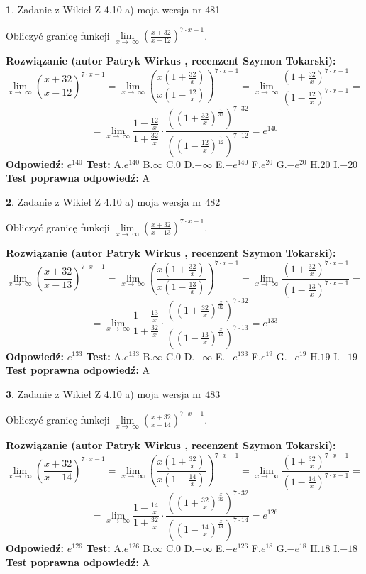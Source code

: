 \documentclass[12pt, a4paper]{article}
\theoremstyle{definition} %
\newtheorem{zad}{}
\newcommand{\zadStart}[1]{\begin{zad}#1\newline}
\newcommand{\zadStop}{\end{zad}}
\newcommand{\rozwStart}[2]{\noindent \textbf{Rozwiązanie (autor #1 , recenzent #2): }\newline}
\newcommand{\rozwStop}{\newline}
\newcommand{\odpStart}{\noindent \textbf{Odpowiedź:}\newline}
\newcommand{\odpStop}{\newline}
\newcommand{\testStart}{\noindent \textbf{Test:}\newline}
\newcommand{\testStop}{\newline}
\newcommand{\kluczStart}{\noindent \textbf{Test poprawna odpowiedź:}\newline}
\newcommand{\kluczStop}{\newline}
\begin{document}
\zadStart{Zadanie z Wikieł Z 4.10 a) moja wersja nr 481}

Obliczyć granicę funkcji  $\lim\limits_{x\to\ \infty}(\frac{x+32}{x-12})^{7\cdot x-1}$.
\zadStop
\rozwStart{Patryk Wirkus}{Szymon Tokarski}
$$\lim\limits_{x\to\ \infty}(\frac{x+32}{x-12})^{7\cdot x-1} = \lim\limits_{x\to\ \infty}(\frac{x(1+\frac{32}{x})}{x(1-\frac{12}{x})})^{7\cdot x-1}=\lim\limits_{x\to\ \infty}\frac{(1+\frac{32}{x})^{7\cdot x-1}}{(1-\frac{12}{x})^{7\cdot x-1}}=$$
$$=\lim\limits_{x\to\ \infty}\frac{1-\frac{12}{x}}{1+\frac{32}{x}}\cdot\frac{((1+\frac{32}{x})^{\frac{x}{32}})^{7\cdot32}}{((1-\frac{12}{x})^{\frac{x}{12}})^{7\cdot12}}=e^{140}$$
\rozwStop
\odpStart
$e^{140}$
\odpStop
\testStart
A.$e^{140}$ B.$\infty$ C.$0$ D.$-\infty$ E.$-e^{140}$
F.$e^{20}$ G.$-e^{20}$
H.$20$
I.$-20$
\testStop
\kluczStart
A
\kluczStop



\zadStart{Zadanie z Wikieł Z 4.10 a) moja wersja nr 482}

Obliczyć granicę funkcji  $\lim\limits_{x\to\ \infty}(\frac{x+32}{x-13})^{7\cdot x-1}$.
\zadStop
\rozwStart{Patryk Wirkus}{Szymon Tokarski}
$$\lim\limits_{x\to\ \infty}(\frac{x+32}{x-13})^{7\cdot x-1} = \lim\limits_{x\to\ \infty}(\frac{x(1+\frac{32}{x})}{x(1-\frac{13}{x})})^{7\cdot x-1}=\lim\limits_{x\to\ \infty}\frac{(1+\frac{32}{x})^{7\cdot x-1}}{(1-\frac{13}{x})^{7\cdot x-1}}=$$
$$=\lim\limits_{x\to\ \infty}\frac{1-\frac{13}{x}}{1+\frac{32}{x}}\cdot\frac{((1+\frac{32}{x})^{\frac{x}{32}})^{7\cdot32}}{((1-\frac{13}{x})^{\frac{x}{13}})^{7\cdot13}}=e^{133}$$
\rozwStop
\odpStart
$e^{133}$
\odpStop
\testStart
A.$e^{133}$ B.$\infty$ C.$0$ D.$-\infty$ E.$-e^{133}$
F.$e^{19}$ G.$-e^{19}$
H.$19$
I.$-19$
\testStop
\kluczStart
A
\kluczStop



\zadStart{Zadanie z Wikieł Z 4.10 a) moja wersja nr 483}

Obliczyć granicę funkcji  $\lim\limits_{x\to\ \infty}(\frac{x+32}{x-14})^{7\cdot x-1}$.
\zadStop
\rozwStart{Patryk Wirkus}{Szymon Tokarski}
$$\lim\limits_{x\to\ \infty}(\frac{x+32}{x-14})^{7\cdot x-1} = \lim\limits_{x\to\ \infty}(\frac{x(1+\frac{32}{x})}{x(1-\frac{14}{x})})^{7\cdot x-1}=\lim\limits_{x\to\ \infty}\frac{(1+\frac{32}{x})^{7\cdot x-1}}{(1-\frac{14}{x})^{7\cdot x-1}}=$$
$$=\lim\limits_{x\to\ \infty}\frac{1-\frac{14}{x}}{1+\frac{32}{x}}\cdot\frac{((1+\frac{32}{x})^{\frac{x}{32}})^{7\cdot32}}{((1-\frac{14}{x})^{\frac{x}{14}})^{7\cdot14}}=e^{126}$$
\rozwStop
\odpStart
$e^{126}$
\odpStop
\testStart
A.$e^{126}$ B.$\infty$ C.$0$ D.$-\infty$ E.$-e^{126}$
F.$e^{18}$ G.$-e^{18}$
H.$18$
I.$-18$
\testStop
\kluczStart
A
\kluczStop
\end{document}
